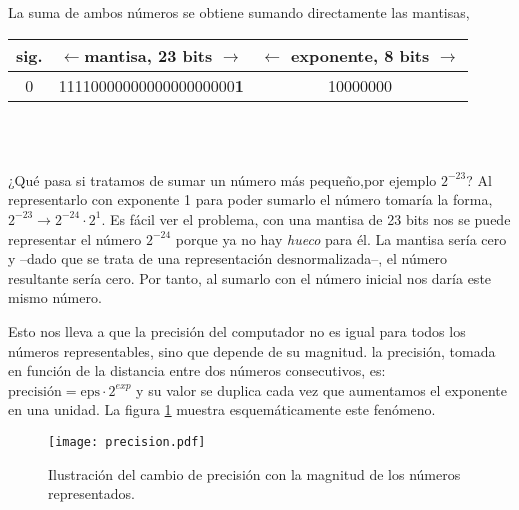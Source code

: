 \begin{paracol}{2}
La suma de ambos números se obtiene sumando directamente las mantisas,
\end{paracol}

\begin{minipage}{\textwidth}
	\centering	
\begin{tabular}{|c||c||c|}
\hline
sig.&$\leftarrow$mantisa, 23 bits $\rightarrow$&$\leftarrow$ exponente, 8 bits $\rightarrow$\\
\hline
0&1111000000000000000000\textbf{1}&10000000\\
\hline
\end{tabular}\\
\ \\
\end{minipage}

\begin{paracol}{2}
¿Qué pasa si tratamos de sumar un número más pequeño,por ejemplo $2^{-23}$? Al representarlo con exponente 1 para poder sumarlo el número tomaría la forma, $2^{-23}\rightarrow 2^{-24}\cdot2^{1}$. Es fácil ver el problema, con una mantisa de 23 bits nos se puede representar el número $2^{-24}$ porque ya no hay \emph{hueco} para él. La mantisa sería cero y --dado que se trata de una representación desnormalizada--, el número resultante sería cero. Por tanto, al sumarlo con el número inicial nos daría este mismo número.

Esto nos lleva a que la precisión del computador no es igual para todos los números representables, sino que depende de su magnitud. la precisión, tomada en función de la distancia entre dos números consecutivos, es: $\text{precisión}=\text{eps}\cdot 2^{exp}$ y su valor se duplica cada vez que aumentamos el exponente en una unidad. La figura \ref{fig:precision} muestra esquemáticamente este fenómeno.
\end{paracol}

\begin{figure}[h]
	\centering
		\texttt{[image: precision.pdf]}
	\caption{Ilustración del cambio de precisión con la magnitud de los números representados.}
	\label{fig:precision}
\end{figure}

